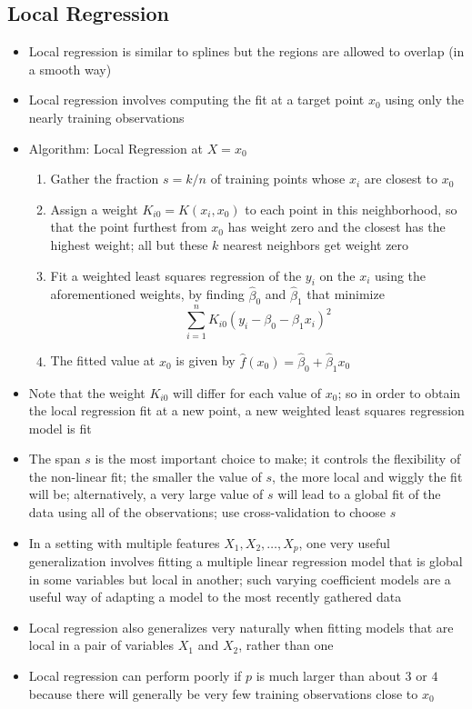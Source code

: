 \documentclass[12pt]{article}
\begin{document}
\subsection{Local Regression}
\begin{itemize} 
\item Local regression is similar to splines but the regions are allowed to overlap (in a smooth way)
\item Local regression involves computing the fit at a target point $x_0$ using only the nearly training observations 
\item Algorithm: Local Regression at $X = x_0$ \begin{enumerate}
\item Gather the fraction $s = k/n$ of training points whose $x_i$ are closest to $x_0$ 
\item Assign a weight $K_{i0} = K(x_i,x_0)$ to each point in this neighborhood, so that the point furthest from $x_0$ has weight zero and the closest has the highest weight; all but these $k$ nearest neighbors get weight zero
\item Fit a weighted least squares regression of the $y_i$ on the $x_i$ using the aforementioned weights, by finding $\hat{\beta}_0$ and $\hat{\beta}_1$ that minimize $$ \sum_{i=1}^n K_{i0}(y_i - \beta_0 - \beta_1x_i)^2 $$ 
\item The fitted value at $x_0$ is given by $\hat{f}(x_0) = \hat{\beta}_0 + \hat{\beta}_1x_0 $ \end{enumerate} 
\item Note that the weight $K_{i0}$ will differ for each value of $x_0$; so in order to obtain the local regression fit at a new point, a new weighted least squares regression model is fit 
\item The span $s$ is the most important choice to make; it controls the flexibility of the non-linear fit; the smaller the value of $s$, the more local and wiggly the fit will be; alternatively, a very large value of $s$ will lead to a global fit of the data using all of the observations; use cross-validation to choose $s $
\item In a setting with multiple features $X_1,X_2,\dots,X_p$, one very useful generalization involves fitting a multiple linear regression model that is global in some variables but local in another; such varying coefficient models are a useful way of adapting a model to the most recently gathered data 
\item Local regression also generalizes very naturally when fitting models that are local in a pair of variables $X_1$ and $X_2$, rather than one 
\item Local regression can perform poorly if $p$ is much larger than about $3$ or $4$ because there will generally be very few training observations close to $x_0$
\end{itemize} 
\end{document}
